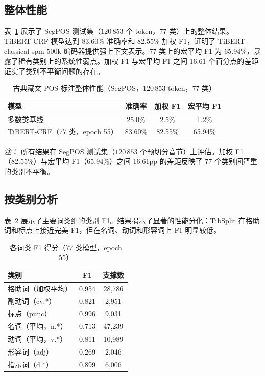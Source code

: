 \documentclass[11pt,a4paper]{article}
\begin{document}
\subsection{整体性能}

表~\ref{tab:results} 展示了 SegPOS 测试集（$120\,853$ 个 token，77 类）上的整体结果。TiBERT-CRF 模型达到 83.60\% 准确率和 82.55\% 加权 F1，证明了 TiBERT-classical-spm-500k 编码器提供强上下文表示。77 类上的宏平均 F1 为 65.94\%，暴露了稀有类别上的系统性弱点。加权 F1 与宏平均 F1 之间 16.61 个百分点的差距证实了类别不平衡问题的存在。

\begin{table}[h]
\centering
\caption{古典藏文 POS 标注整体性能（SegPOS，$120\,853$ token，77 类）}
\label{tab:results}
\begin{tabular}{lccc}
\toprule
模型                    & 准确率 & 加权 F1 & 宏平均 F1 \\
\midrule
多数类基线              & 25.0\%   & 2.5\%       & 1.2\%    \\
TiBERT-CRF（77 类，epoch 55） & 83.60\% & 82.55\% & 65.94\% \\
\bottomrule
\end{tabular}
\end{table}

\textit{注：} 所有结果在 SegPOS 测试集（$120\,853$ 个预切分音节）上评估。加权 F1（82.55\%）与宏平均 F1（65.94\%）之间 16.61pp 的差距反映了 77 个类别间严重的类别不平衡。

\subsection{按类别分析}

表~\ref{tab:percat} 展示了主要词类组的类别 F1。结果揭示了显著的性能分化：TibSplit 在格助词和标点上接近完美 F1，但在名词、动词和形容词上 F1 明显较低。

\begin{table}[h]
\centering
\caption{各词类 F1 得分（77 类模型，epoch 55）}
\label{tab:percat}
\begin{tabular}{lcc}
\toprule
类别                      & F1    & 支撑数 \\
\midrule
格助词（加权平均）          & 0.954 & 28,786 \\
副动词（cv.*）              & 0.821    & 2,951   \\
标点（punc）                & 0.996    & 9,031   \\
名词（平均，n.*）           & 0.713    & 47,239  \\
动词（平均，v.*）           & 0.811    & 10,989  \\
形容词（adj）               & 0.269    & 2,046   \\
指示词（d.*）               & 0.899    & 6,006   \\
\bottomrule
\end{tabular}
\end{table}
\end{document}
